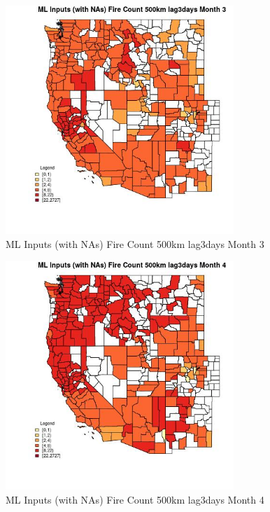 \begin{figure} 
\centering  
\includegraphics[width=0.77\textwidth]{Code_Outputs/Report_ML_input_PM25_Step4_part_f_de_duplicated_aves_prioritize_24hr_obswNAs_CountyFire_Count_500km_lag3daysmedianMonth3.jpg} 
\caption{\label{fig:Report_ML_input_PM25_Step4_part_f_de_duplicated_aves_prioritize_24hr_obswNAsCountyFire_Count_500km_lag3daysmedianMonth3}ML Inputs (with NAs) Fire Count 500km lag3days Month 3} 
\end{figure} 
 

\begin{figure} 
\centering  
\includegraphics[width=0.77\textwidth]{Code_Outputs/Report_ML_input_PM25_Step4_part_f_de_duplicated_aves_prioritize_24hr_obswNAs_CountyFire_Count_500km_lag3daysmedianMonth4.jpg} 
\caption{\label{fig:Report_ML_input_PM25_Step4_part_f_de_duplicated_aves_prioritize_24hr_obswNAsCountyFire_Count_500km_lag3daysmedianMonth4}ML Inputs (with NAs) Fire Count 500km lag3days Month 4} 
\end{figure} 
 

